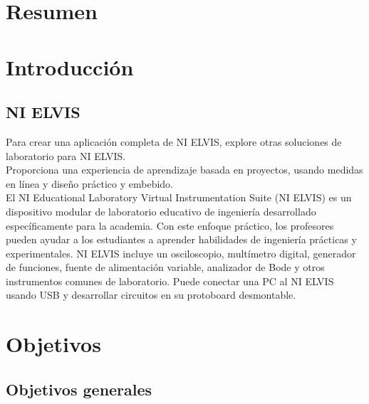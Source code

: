 \documentclass[]{article}
\begin{document}
	


\tableofcontents  %


\section{Resumen}

\section{Introducción}


\subsection{NI ELVIS}

Para crear una aplicación completa de NI ELVIS, explore otras soluciones de laboratorio para NI ELVIS.\\

Proporciona una experiencia de aprendizaje basada en proyectos, usando medidas en línea y diseño práctico y embebido.\\

El NI Educational Laboratory Virtual Instrumentation Suite (NI ELVIS) es un dispositivo modular de laboratorio educativo de ingeniería desarrollado específicamente para la academia. Con este enfoque práctico, los profesores pueden ayudar a los estudiantes a aprender habilidades de ingeniería prácticas y experimentales. NI ELVIS incluye un osciloscopio, multímetro digital, generador de funciones, fuente de alimentación variable, analizador de Bode y otros instrumentos comunes de laboratorio. Puede conectar una PC al NI ELVIS usando USB y desarrollar circuitos en su protoboard desmontable.\cite{NationalInstruments2018}\\


\section{Objetivos}

\subsection{Objetivos generales}
\end{document}
